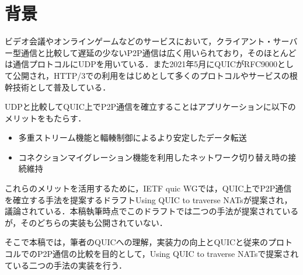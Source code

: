 \section{背景}



ビデオ会議やオンラインゲームなどのサービスにおいて，クライアント・サーバー型通信と比較して遅延の少ないP2P通信は広く用いられており，そのほとんどは通信プロトコルにUDP\cite{rfc768}を用いている．また2021年5月にQUIC\cite{rfc9000}がRFC9000として公開され，HTTP/3\cite{rfc9114}での利用をはじめとして多くのプロトコルやサービスの根幹技術として普及している．

UDPと比較してQUIC上でP2P通信を確立することはアプリケーションに以下のメリットをもたらす．
\begin{itemize}
    \item 多重ストリーム機能と輻輳制御によるより安定したデータ転送
    \item コネクションマイグレーション機能を利用したネットワーク切り替え時の接続維持
\end{itemize}

これらのメリットを活用するために，IETF quic WGでは，QUIC上でP2P通信を確立する手法を提案するドラフトUsing QUIC to traverse NATs\cite{quic_nat}が提案され，議論されている．本稿執筆時点でこのドラフトでは二つの手法が提案されているが，そのどちらの実装も公開されていない．

そこで本稿では，筆者のQUICへの理解，実装力の向上とQUICと従来のプロトコルでのP2P通信の比較を目的として，Using QUIC to traverse NATsで提案されている二つの手法の実装を行う．
